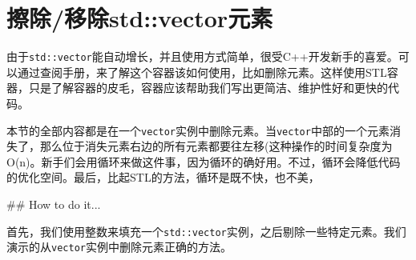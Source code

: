 \section{擦除/移除std::vector元素}

由于\texttt{std::vector}能自动增长，并且使用方式简单，很受C++开发新手的喜爱。可以通过查阅手册，来了解这个容器该如何使用，比如删除元素。这样使用STL容器，只是了解容器的皮毛，容器应该帮助我们写出更简洁、维护性好和更快的代码。

本节的全部内容都是在一个\texttt{vector}实例中删除元素。当\texttt{vector}中部的一个元素消失了，那么位于消失元素右边的所有元素都要往左移(这种操作的时间复杂度为O(n)。新手们会用循环来做这件事，因为循环的确好用。不过，循环会降低代码的优化空间。最后，比起STL的方法，循环是既不快，也不美，

\#\# How to do it...

首先，我们使用整数来填充一个\texttt{std::vector}实例，之后剔除一些特定元素。我们演示的从\texttt{vector}实例中删除元素正确的方法。

